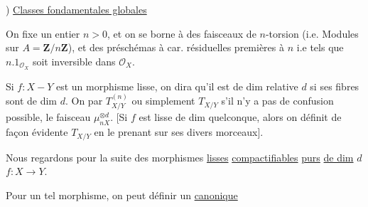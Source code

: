 ) \uline{Classes fondamentales globales}

On fixe un entier $n>0$, et on se
borne à des faisceaux de $n$-torsion (i.e. Modules sur $A=\mathbf Z/n\mathbf Z$), et des préschémas à car. résiduelles premières à $n$ i.e tels que $n.1_{\mathcal O_X}$ soit inversible dans $\mathcal O_X$.

Si $f:X\mathbin{-}Y$ est un morphisme lisse, on dira qu'il est  de dim relative $d$ si ses fibres sont  de dim $d$. On  par $T_{X/Y}^{(n)}$ ou simplement $T_{X/Y}$ s'il n'y a pas de confusion possible, le faisceau $\mu_{nX}^{\otimes d}$. [Si $f$ est lisse de dim  quelconque, alors on définit de façon évidente $T_{X/Y}$ en le prenant sur ses divers morceaux].

Nous regardons pour la suite des morphismes \uline{lisses} \uline{compactifiables} \uline{purs} \uline{de dim} $d$\quad $f:X\longrightarrow Y$.

Pour un tel morphisme, on peut définir un \uline{  canonique}
